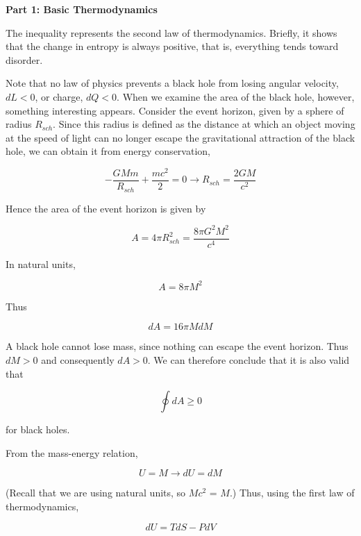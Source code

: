 \documentclass[11pt]{article}
\begin{document}
\begin{pproblem}
    \begin{pssolution*}{}{}
        \begin{center}
            \textbf{Part 1: Basic Thermodynamics}
        \end{center}
        \begin{alternativas}
            \item The inequality represents the second law of thermodynamics. Briefly, it shows that the change in entropy is always positive, that is, everything tends toward disorder.
            
            \item Note that no law of physics prevents a black hole from losing angular velocity, \(dL < 0\), or charge, \(dQ<0\). When we examine the area of the black hole, however, something interesting appears. Consider the event horizon, given by a sphere of radius \(R_{sch}\). Since this radius is defined as the distance at which an object moving at the speed of light can no longer escape the gravitational attraction of the black hole, we can obtain it from energy conservation,
            
            \[-\frac{GMm}{R_{sch}} + \frac{mc^2}{2} = 0 \rightarrow R_{sch} = \frac{2GM}{c^2}\]
            
            Hence the area of the event horizon is given by

            \[A = 4\pi R_{sch}^2 = \frac{8\pi G^2M^2}{c^4}\]

            In natural units,

            \[A = 8\pi M^2\]

            Thus

            \[dA = 16\pi MdM\]

            A black hole cannot lose mass, since nothing can escape the event horizon. Thus \(dM>0\) and consequently \(dA>0\). We can therefore conclude that it is also valid that
            
            \[\oint dA \geq 0\]

            for black holes.

            \item From the mass-energy relation,
            
            \[U = M \rightarrow dU = dM\]

            (Recall that we are using natural units, so \(Mc^2\) = \(M\).) Thus, using the first law of thermodynamics,

            \[dU = TdS - PdV\]


\end{alternativas}
\end{pssolution*}
\end{pproblem}
\end{document}
